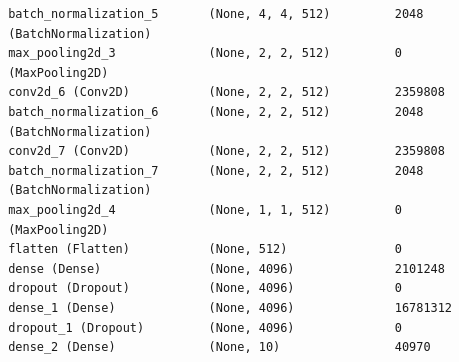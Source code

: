 \documentclass{article}
\begin{document}
\begin{titlepage}
\begin{lstlisting}
 batch_normalization_5       (None, 4, 4, 512)         2048      
 (BatchNormalization)                                                                                                       
 max_pooling2d_3             (None, 2, 2, 512)         0         
 (MaxPooling2D)                                                                                                                   
 conv2d_6 (Conv2D)           (None, 2, 2, 512)         2359808                                                     
 batch_normalization_6       (None, 2, 2, 512)         2048      
 (BatchNormalization)
 conv2d_7 (Conv2D)           (None, 2, 2, 512)         2359808                                                            
 batch_normalization_7       (None, 2, 2, 512)         2048      
 (BatchNormalization)                                                                                                         
 max_pooling2d_4             (None, 1, 1, 512)         0         
 (MaxPooling2D)                                                                                                                      
 flatten (Flatten)           (None, 512)               0                                                               
 dense (Dense)               (None, 4096)              2101248                                                               
 dropout (Dropout)           (None, 4096)              0                                                                 
 dense_1 (Dense)             (None, 4096)              16781312                                                           
 dropout_1 (Dropout)         (None, 4096)              0                                                            
 dense_2 (Dense)             (None, 10)                40970     
                                                                 

\end{lstlisting}
\end{titlepage}
\end{document}
